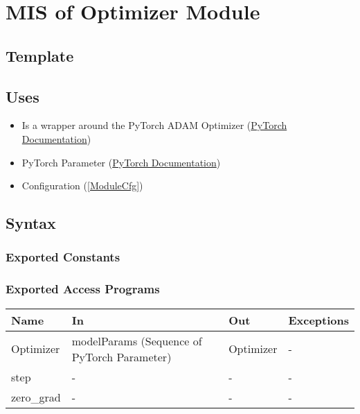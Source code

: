 \documentclass[12pt, titlepage]{article}
\begin{document}
\newpage

\section{MIS of Optimizer Module} \label{ModuleOptim} 

\subsection{Template}



\subsection{Uses}
\begin{itemize}
  \item Is a wrapper around the PyTorch ADAM Optimizer (\href{https://pytorch.org/docs/stable/optim.html}{PyTorch Documentation})
  \item PyTorch Parameter (\href{https://pytorch.org/docs/stable/generated/torch.nn.parameter.Parameter.html}{PyTorch Documentation})
  \item Configuration (\ref{ModuleCfg})
\end{itemize}

\subsection{Syntax}



\subsubsection{Exported Constants}



\subsubsection{Exported Access Programs}

\begin{center}
\begin{tabular}{p{2cm}|p{6cm}|p{2cm}|p{2cm}}
\hline
\textbf{Name} & \textbf{In} & \textbf{Out} & \textbf{Exceptions} \\
\hline
Optimizer & modelParams (Sequence of PyTorch Parameter) & Optimizer & - \\
\hline
step & - & - & - \\
\hline
zero\_grad & - & - & - \\
\hline
\end{tabular}
\end{center}
\end{document}
